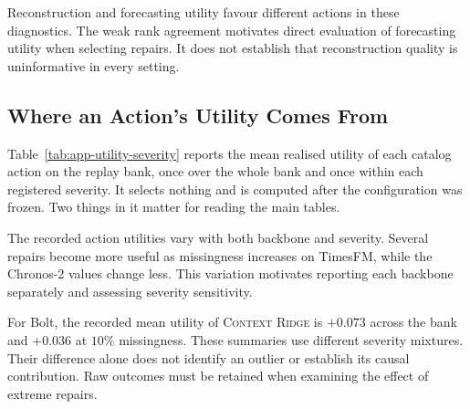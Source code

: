 \documentclass{article}
\begin{document}
Reconstruction and forecasting utility favour different actions in these diagnostics.
The weak rank agreement motivates direct evaluation of forecasting utility when selecting
repairs. It does not establish that reconstruction quality is uninformative in every setting.

\subsection{Where an Action's Utility Comes From}
\label{app:utility-by-severity}
Table~\ref{tab:app-utility-severity} reports the mean realised utility of each catalog action
on the replay bank, once over the whole bank and once within each registered severity. It
selects nothing and is computed after the configuration was frozen. Two things in it matter for
reading the main tables.

The recorded action utilities vary with both backbone and severity. Several repairs become
more useful as missingness increases on TimesFM, while the Chronos-2 values change less.
This variation motivates reporting each backbone separately and assessing severity sensitivity.

For Bolt, the recorded mean utility of \textsc{Context Ridge} is $+0.073$ across the bank
and $+0.036$ at $10\%$ missingness. These summaries use different severity mixtures.
Their difference alone does not identify an outlier or establish its causal contribution.
Raw outcomes must be retained when examining the effect of extreme repairs.
\end{document}
